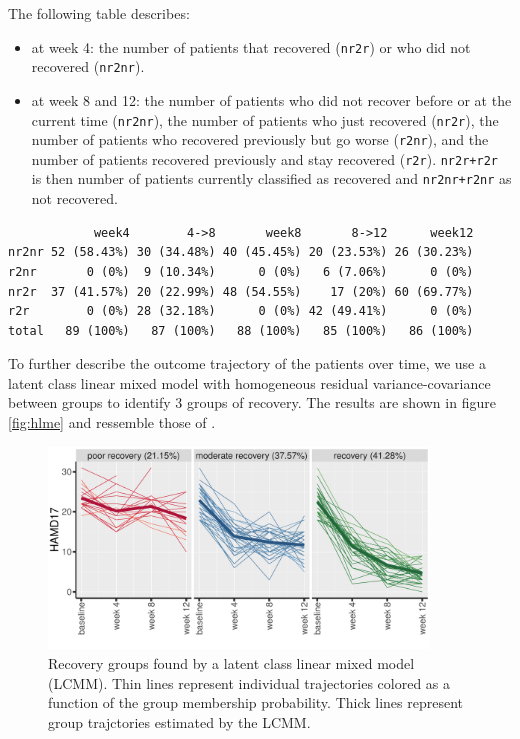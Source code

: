 \documentclass[12pt]{article}
\begin{document}
The following table describes:
\begin{itemize}
\item at week 4: the number of patients that recovered (\texttt{nr2r}) or who did
not recovered (\texttt{nr2nr}).
\item at week 8 and 12: the number of patients who did not recover before
or at the current time (\texttt{nr2nr}), the number of patients who just
recovered (\texttt{nr2r}), the number of patients who recovered previously
but go worse (\texttt{r2nr}), and the number of patients recovered
previously and stay recovered (\texttt{r2r}). \texttt{nr2r+r2r} is then number of
patients currently classified as recovered and \texttt{nr2nr+r2nr} as not
recovered.
\end{itemize}
\label{}
\begin{verbatim}
            week4        4->8       week8       8->12      week12
nr2nr 52 (58.43%) 30 (34.48%) 40 (45.45%) 20 (23.53%) 26 (30.23%)
r2nr       0 (0%)  9 (10.34%)      0 (0%)   6 (7.06%)      0 (0%)
nr2r  37 (41.57%) 20 (22.99%) 48 (54.55%)    17 (20%) 60 (69.77%)
r2r        0 (0%) 28 (32.18%)      0 (0%) 42 (49.41%)      0 (0%)
total   89 (100%)   87 (100%)   88 (100%)   85 (100%)   86 (100%)
\end{verbatim}


To further describe the outcome trajectory of the patients over time,
we use a latent class linear mixed model with homogeneous residual
variance-covariance between groups to identify 3 groups of
recovery. The results are shown in figure \autoref{fig:hlme} and
ressemble those of \cite{goerigk2021distinct}.

\begin{figure}[!h]
\centering
\includegraphics[trim={0 0 0 0},width=0.9\textwidth]{./../figures/spaghetti-HAMD17.pdf}
\caption{\label{fig:hlme}Recovery groups found by a latent class linear mixed model (LCMM). Thin lines represent individual trajectories colored as a function of the group membership probability. Thick lines represent group trajctories estimated by the LCMM.}
\end{figure}
\end{document}
